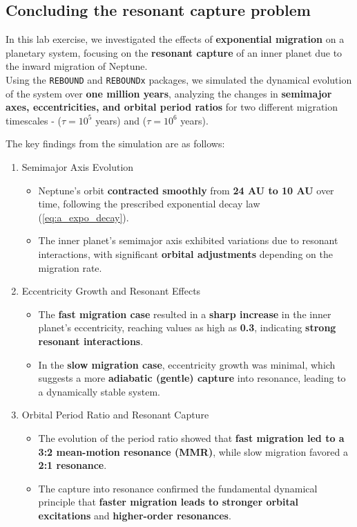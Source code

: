 \documentclass[12pt,a4paper]{article}
\begin{document}
\subsection{Concluding the resonant capture problem}
In this lab exercise, we investigated the effects of \textbf{exponential migration} on a planetary system, focusing on the \textbf{resonant capture} of an inner planet due to the inward migration of Neptune.
\\ Using the \texttt{REBOUND} and \texttt{REBOUNDx} packages, we simulated the dynamical evolution of the system over \textbf{one million years}, analyzing the changes in \textbf{semimajor axes, eccentricities, and orbital period ratios} for two different migration timescales - (\(\tau = 10^5\) years) and (\(\tau = 10^6\) years).

\noindent The key findings from the simulation are as follows:

\begin{enumerate}
  \item Semimajor Axis Evolution
  \begin{itemize}
    \item Neptune’s orbit \textbf{contracted smoothly} from \textbf{24 AU to 10 AU} over time, following the prescribed exponential decay law (\ref{eq:a_expo_decay}).
    \item The inner planet's semimajor axis exhibited variations due to resonant interactions, with significant \textbf{orbital adjustments} depending on the migration rate.
  \end{itemize}
  \item Eccentricity Growth and Resonant Effects
  \begin{itemize}
    \item The \textbf{fast migration case} resulted in a \textbf{sharp increase} in the inner planet’s eccentricity, reaching values as high as \textbf{0.3}, indicating \textbf{strong resonant interactions}.
    \item In the \textbf{slow migration case}, eccentricity growth was minimal, which suggests a more \textbf{adiabatic (gentle) capture} into resonance, leading to a dynamically stable system.
  \end{itemize}
  \item Orbital Period Ratio and Resonant Capture
  \begin{itemize}
    \item The evolution of the period ratio showed that \textbf{fast migration led to a 3:2 mean-motion resonance (MMR)}, while slow migration favored a \textbf{2:1 resonance}.
    \item The capture into resonance confirmed the fundamental dynamical principle that \textbf{faster migration leads to stronger orbital excitations} and \textbf{higher-order resonances}.
  \end{itemize}
\end{enumerate}
\end{document}
